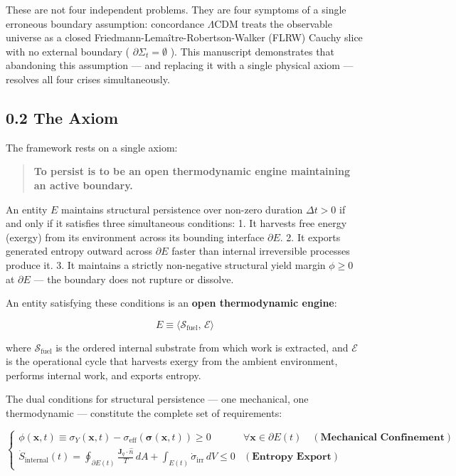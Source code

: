 \documentclass[11pt,a4paper]{article}
\theoremstyle{definition}\newtheorem{definition}{Definition}
\theoremstyle{remark}\newtheorem{remark}{Remark}
\begin{document}
These are not four independent problems. They are four symptoms of a single erroneous boundary assumption: concordance $\Lambda\text{CDM}$ treats the observable universe as a closed Friedmann-Lemaître-Robertson-Walker (FLRW) Cauchy slice with no external boundary ( $\partial\Sigma_t = \emptyset$ ). This manuscript demonstrates that abandoning this assumption — and replacing it with a single physical axiom — resolves all four crises simultaneously.
\subsection{0.2 The Axiom}

The framework rests on a single axiom:

\begin{quote}\textbf{To persist is to be an open thermodynamic engine maintaining an active boundary.}\end{quote}

An entity $E$ maintains structural persistence over non-zero duration $\Delta t > 0$ if and only if it satisfies three simultaneous conditions:
1. It harvests free energy (exergy) from its environment across its bounding interface $\partial E$.
2. It exports generated entropy outward across $\partial E$ faster than internal irreversible processes produce it.
3. It maintains a strictly non-negative structural yield margin $\phi \ge 0$ at $\partial E$ — the boundary does not rupture or dissolve.

An entity satisfying these conditions is an \textbf{open thermodynamic engine}:


\begin{equation}
\boxed{E \equiv \langle \mathcal{S}_{\text{fuel}},\, \mathcal{E} \rangle}
\end{equation}


where $\mathcal{S}_{\text{fuel}}$ is the ordered internal substrate from which work is extracted, and $\mathcal{E}$ is the operational cycle that harvests exergy from the ambient environment, performs internal work, and exports entropy.

The dual conditions for structural persistence — one mechanical, one thermodynamic — constitute the complete set of requirements:


\begin{equation}
\boxed{\begin{cases}
\phi(\mathbf{x}, t) \equiv \sigma_Y(\mathbf{x}, t) - \sigma_{\text{eff}}(\boldsymbol{\sigma}(\mathbf{x}, t)) \ge 0 & \forall \mathbf{x} \in \partial E(t) \quad (\textbf{Mechanical Confinement}) \\[8pt]
\dot{S}_{\text{internal}}(t) = \oint_{\partial E(t)} \frac{\mathbf{J}_q \cdot \hat{n}}{T} \, dA + \int_{E(t)} \dot{\sigma}_{\text{irr}} \, dV \le 0 & (\textbf{Entropy Export})
\end{cases}}
\end{equation}
\end{document}

